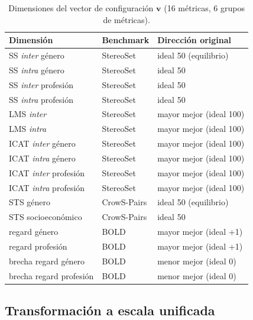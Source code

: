 \documentclass[12pt,a4paper]{report}
\newcommand{\vconfig}{\ensuremath{\mathbf{v}}}
\begin{document}
\begin{table}[H]
\centering\footnotesize
\setlength{\tabcolsep}{5pt}
\caption{Dimensiones del vector de configuración \vconfig{} (16 métricas, 6 grupos de métricas).}
\label{tab:vector_dims}
\begin{tabularx}{\linewidth}{@{} L l l @{}}
\toprule
\textbf{Dimensión} & \textbf{Benchmark} & \textbf{Dirección original} \\
\midrule
SS \textit{inter} género        & StereoSet   & ideal 50 (equilibrio) \\
SS \textit{intra} género        & StereoSet   & ideal 50 \\
SS \textit{inter} profesión     & StereoSet   & ideal 50 \\
SS \textit{intra} profesión     & StereoSet   & ideal 50 \\
LMS \textit{inter}              & StereoSet   & mayor mejor (ideal 100) \\
LMS \textit{intra}              & StereoSet   & mayor mejor (ideal 100) \\
ICAT \textit{inter} género      & StereoSet   & mayor mejor (ideal 100) \\
ICAT \textit{intra} género      & StereoSet   & mayor mejor (ideal 100) \\
ICAT \textit{inter} profesión   & StereoSet   & mayor mejor (ideal 100) \\
ICAT \textit{intra} profesión   & StereoSet   & mayor mejor (ideal 100) \\
STS género                      & CrowS-Pairs & ideal 50 (equilibrio) \\
STS socioeconómico              & CrowS-Pairs & ideal 50 \\
regard género                   & BOLD        & mayor mejor (ideal +1) \\
regard profesión                & BOLD        & mayor mejor (ideal +1) \\
brecha regard género            & BOLD        & menor mejor (ideal 0) \\
brecha regard profesión         & BOLD        & menor mejor (ideal 0) \\
\bottomrule
\end{tabularx}
\end{table}

\subsection{Transformación a escala unificada}
\label{subsec:ex_normalizacion}
\end{document}
